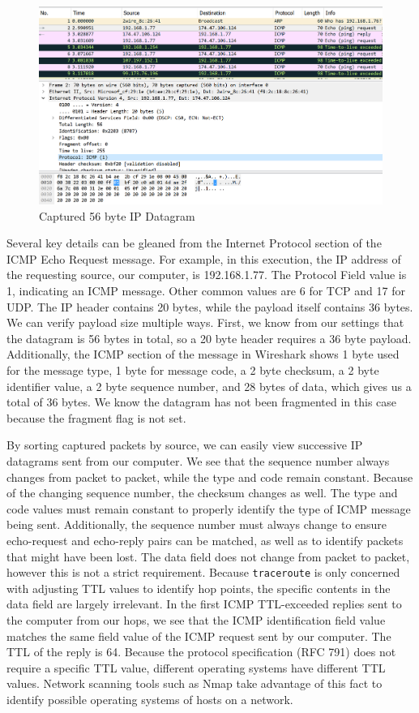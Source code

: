 \documentclass[10pt]{IEEEtran}
\begin{document}
\begin{figure}[h!]
	\includegraphics[width=\linewidth]{lab2packet1.png}
	\caption{Captured 56 byte IP Datagram}
	\label{fig:packet1}
\end{figure}
 
 Several key details can be gleaned from the Internet Protocol section of the ICMP Echo Request message. For example, in this execution, the IP address of the requesting source, our computer, is 192.168.1.77. The Protocol Field value is 1, indicating an ICMP message. Other common values are 6 for TCP and 17 for UDP. The IP header contains 20 bytes, while the payload itself contains 36 bytes. We can verify payload size multiple ways. First, we know from our settings that the datagram is 56 bytes in total, so a 20 byte header requires a 36 byte payload. Additionally, the ICMP section of the message in Wireshark shows 1 byte used for the message type, 1 byte for message code, a 2 byte checksum, a 2 byte identifier value, a 2 byte sequence number, and 28 bytes of data, which gives us a total of 36 bytes. We know the datagram has not been fragmented in this case because the fragment flag is not set.
 
 By sorting captured packets by source, we can easily view successive IP datagrams sent from our computer. We see that the sequence number always changes from packet to packet, while the type and code remain constant. Because of the changing sequence number, the checksum changes as well. The type and code values must remain constant to properly identify the type of ICMP message being sent. Additionally, the sequence number must always change to ensure echo-request and echo-reply pairs can be matched, as well as to identify packets that might have been lost. The data field does not change from packet to packet, however this is not a strict requirement. Because {\tt traceroute} is only concerned with adjusting TTL values to identify hop points, the specific contents in the data field are largely irrelevant. In the first ICMP TTL-exceeded replies sent to the computer from our hops, we see that the ICMP identification field value matches the same field value of the ICMP request sent by our computer. The TTL of the reply is 64. Because the protocol specification (RFC 791) does not require a specific TTL value, different operating systems have different TTL values. Network scanning tools such as Nmap take advantage of this fact to identify possible operating systems of hosts on a network.
 
\end{document}
